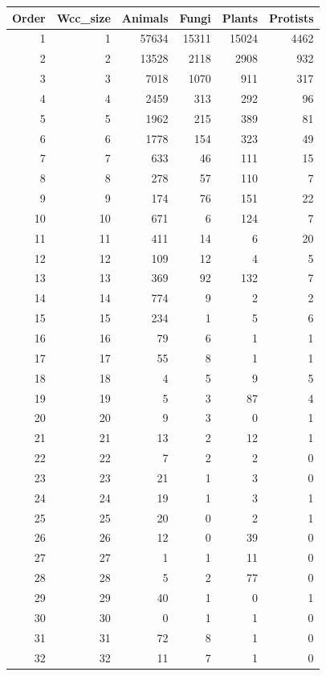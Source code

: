 \documentclass[
  letterpaper,
  DIV=11,
  numbers=noendperiod]{scrreprt}
\begin{document}
\begin{tabular}{r|r|r|r|r|r}
\hline
Order & Wcc\_size & Animals & Fungi & Plants & Protists\\
\hline
1 & 1 & 57634 & 15311 & 15024 & 4462\\
\hline
2 & 2 & 13528 & 2118 & 2908 & 932\\
\hline
3 & 3 & 7018 & 1070 & 911 & 317\\
\hline
4 & 4 & 2459 & 313 & 292 & 96\\
\hline
5 & 5 & 1962 & 215 & 389 & 81\\
\hline
6 & 6 & 1778 & 154 & 323 & 49\\
\hline
7 & 7 & 633 & 46 & 111 & 15\\
\hline
8 & 8 & 278 & 57 & 110 & 7\\
\hline
9 & 9 & 174 & 76 & 151 & 22\\
\hline
10 & 10 & 671 & 6 & 124 & 7\\
\hline
11 & 11 & 411 & 14 & 6 & 20\\
\hline
12 & 12 & 109 & 12 & 4 & 5\\
\hline
13 & 13 & 369 & 92 & 132 & 7\\
\hline
14 & 14 & 774 & 9 & 2 & 2\\
\hline
15 & 15 & 234 & 1 & 5 & 6\\
\hline
16 & 16 & 79 & 6 & 1 & 1\\
\hline
17 & 17 & 55 & 8 & 1 & 1\\
\hline
18 & 18 & 4 & 5 & 9 & 5\\
\hline
19 & 19 & 5 & 3 & 87 & 4\\
\hline
20 & 20 & 9 & 3 & 0 & 1\\
\hline
21 & 21 & 13 & 2 & 12 & 1\\
\hline
22 & 22 & 7 & 2 & 2 & 0\\
\hline
23 & 23 & 21 & 1 & 3 & 0\\
\hline
24 & 24 & 19 & 1 & 3 & 1\\
\hline
25 & 25 & 20 & 0 & 2 & 1\\
\hline
26 & 26 & 12 & 0 & 39 & 0\\
\hline
27 & 27 & 1 & 1 & 11 & 0\\
\hline
28 & 28 & 5 & 2 & 77 & 0\\
\hline
29 & 29 & 40 & 1 & 0 & 1\\
\hline
30 & 30 & 0 & 1 & 1 & 0\\
\hline
31 & 31 & 72 & 8 & 1 & 0\\
\hline
32 & 32 & 11 & 7 & 1 & 0\\

\end{tabular}
\end{document}
